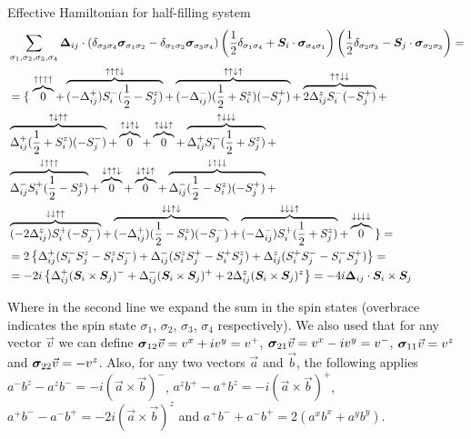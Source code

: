 \begin{section}{Effective Hamiltonian for half-filling system}
\begin{align*}
&\sum_{\sigma_1, \sigma_2, \sigma_3, \sigma_4}\boldsymbol{\Delta}_{ij}\cdot(\delta_{\sigma_3 \sigma_4}\boldsymbol{\sigma}_{\sigma_1 \sigma_2} - \delta_{\sigma_1 \sigma_2} \boldsymbol{\sigma}_{\sigma_3\sigma_4})\left(\frac{1}{2}\delta_{\sigma_1 \sigma_4} + \boldsymbol{S}_i\cdot\boldsymbol{\sigma}_{\sigma_4 \sigma_1}\right)\left(\frac{1}{2}\delta_{\sigma_2 \sigma_3}-\boldsymbol{S}_j\cdot\boldsymbol{\sigma}_{\sigma_2 \sigma_3}\right) = \\
 &= \left\{ \right.
	\overbrace{0}^{\uparrow \uparrow \uparrow \uparrow} +
	\overbrace{(-\Delta_{ij}^+)S_i^-(\frac{1}{2}-S_j^z)}^{\uparrow \uparrow \uparrow \downarrow} +
	\overbrace{(-\Delta_{ij}^-)(\frac{1}{2}+ S_i^z)(-S_j^+)}^{\uparrow \uparrow \downarrow \uparrow} +
	\overbrace{2\Delta_{ij}^z S_i^-(-S_j^+)}^{\uparrow \uparrow \downarrow \downarrow} + \\
	&\overbrace{\Delta_{ij}^+ (\frac{1}{2}+S_i^z)(-S_j^-)}^{\uparrow \downarrow \uparrow \uparrow} +
	\overbrace{0}^{\uparrow \downarrow \uparrow \downarrow} +
	\overbrace{0}^{\uparrow \downarrow \downarrow \uparrow} +
	\overbrace{\Delta_{ij}^+ S_i^-(\frac{1}{2}+S_j^z)}^{\uparrow \downarrow \downarrow \downarrow} + \\
	&\overbrace{\Delta_{ij}^- S_i^+(\frac{1}{2}-S_j^z)}^{\downarrow \uparrow \uparrow \uparrow} +
	\overbrace{0}^{\downarrow \uparrow \uparrow \downarrow} +
	\overbrace{0}^{\downarrow \uparrow \downarrow \uparrow} +
	\overbrace{\Delta_{ij}^- (\frac{1}{2} - S_i^z) (-S_j^+)}^{\downarrow \uparrow \downarrow \downarrow} + \\
	& \overbrace{(-2\Delta_{ij}^z)S_i^+(-S_j^-)}^{\downarrow \downarrow \uparrow \uparrow} +
	\overbrace{(-\Delta_{ij}^+) (\frac{1}{2}-S_i^z)(-S_j^-)}^{\downarrow \downarrow \uparrow \downarrow} +
	\overbrace{(-\Delta_{ij}^-) S_i^+(\frac{1}{2}+S_j^z)}^{\downarrow \downarrow \downarrow \uparrow} +
	\overbrace{0}^{\downarrow \downarrow \downarrow \downarrow}
\left. \right\} = \\
&= 2\left\{ \Delta_{ij}^+ (S_i^-S_j^z - S_i^zS_j^-) + \Delta_{ij}^- (S_i^zS_j^+ - S_i^+S_j^z) + \Delta_{ij}^z (S_i^+S_j^- - S_i^-S_j^+) \right\} = \\
&= -2i\left\{ \Delta_{ij}^+ (\boldsymbol{S}_i\times\boldsymbol{S}_j)^- + \Delta_{ij}^- (\boldsymbol{S}_i\times\boldsymbol{S}_j)^+ + 2\Delta_{ij}^z (\boldsymbol{S}_i\times\boldsymbol{S}_j)^z \right\} = -4i \boldsymbol{\Delta}_{ij}\cdot \boldsymbol{S}_i \times \boldsymbol{S}_j 
\end{align*}

Where in the second line we expand the sum in the spin states (overbrace indicates the spin state $\sigma_1$, $\sigma_2$, $\sigma_3$, $\sigma_4$ respectively). We also used that for any vector $\vec{v}$ we can define $\boldsymbol{\sigma}_{12}\vec{v} = v^x+iv^y = v^+$, $\boldsymbol{\sigma}_{21}\vec{v} = v^x-iv^y = v^-$, $\boldsymbol{\sigma}_{11}\vec{v} = v^z$ and $\boldsymbol{\sigma}_{22}\vec{v} = -v^z$. Also, for any two vectors $\vec{a}$ and $\vec{b}$, the following applies $a^-b^z-a^zb^- = -i(\vec{a}\times\vec{b})^-$, $a^zb^+-a^+b^z=-i(\vec{a}\times\vec{b})^+$, $a^+b^--a^-b^+=-2i(\vec{a}\times \vec{b})^z$ and $a^+b^-+a^-b^+=2(a^xb^x+a^yb^y)$.


\end{section}
